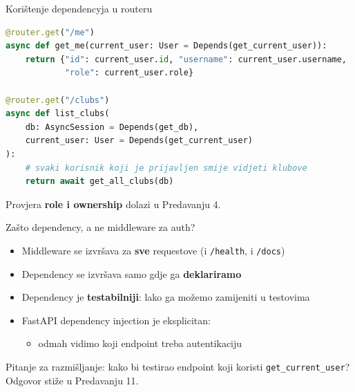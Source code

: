\begin{frame}[fragile,shrink=5]{Korištenje dependencyja u routeru}
\begin{lstlisting}[language=python]
@router.get("/me")
async def get_me(current_user: User = Depends(get_current_user)):
    return {"id": current_user.id, "username": current_user.username,
            "role": current_user.role}

@router.get("/clubs")
async def list_clubs(
    db: AsyncSession = Depends(get_db),
    current_user: User = Depends(get_current_user)
):
    # svaki korisnik koji je prijavljen smije vidjeti klubove
    return await get_all_clubs(db)
\end{lstlisting}

	\vspace{0.4em}
	Provjera \textbf{role i ownership} dolazi u Predavanju 4.
\end{frame}

\begin{frame}{Zašto dependency, a ne middleware za auth?}
	\begin{itemize}
		\item Middleware se izvršava za \textbf{sve} requestove (i \texttt{/health}, i \texttt{/docs})
		\item Dependency se izvršava samo gdje ga \textbf{deklariramo}
		\item Dependency je \textbf{testabilniji}: lako ga možemo zamijeniti u testovima
		\item FastAPI dependency injection je eksplicitan:
		\begin{itemize}
			\item odmah vidimo koji endpoint treba autentikaciju
		\end{itemize}
	\end{itemize}

	\vspace{0.6em}
	Pitanje za razmišljanje: kako bi testirao endpoint koji koristi \texttt{get\_current\_user}? Odgovor stiže u Predavanju 11.
\end{frame}

